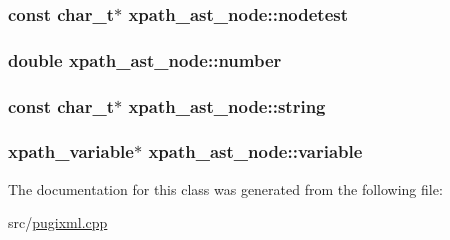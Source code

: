 \hypertarget{classxpath__ast__node_a50f44079b7f3e399e23488f520a34f17}{
\subsubsection[{nodetest}]{\setlength{\rightskip}{0pt plus 5cm}const char\_\-t$\ast$ {\bf xpath\_\-ast\_\-node::nodetest}}}
\label{classxpath__ast__node_a50f44079b7f3e399e23488f520a34f17}
\hypertarget{classxpath__ast__node_a73870c7a83538e525398855b26154484}{
\subsubsection[{number}]{\setlength{\rightskip}{0pt plus 5cm}double {\bf xpath\_\-ast\_\-node::number}}}
\label{classxpath__ast__node_a73870c7a83538e525398855b26154484}
\hypertarget{classxpath__ast__node_a187822d65799b3bbccd8d0522bd14e59}{
\subsubsection[{string}]{\setlength{\rightskip}{0pt plus 5cm}const char\_\-t$\ast$ {\bf xpath\_\-ast\_\-node::string}}}
\label{classxpath__ast__node_a187822d65799b3bbccd8d0522bd14e59}
\hypertarget{classxpath__ast__node_a0fd3b0d8f930836105eeff6e2efa5ad3}{
\subsubsection[{variable}]{\setlength{\rightskip}{0pt plus 5cm}xpath\_\-variable$\ast$ {\bf xpath\_\-ast\_\-node::variable}}}
\label{classxpath__ast__node_a0fd3b0d8f930836105eeff6e2efa5ad3}


The documentation for this class was generated from the following file:\begin{DoxyCompactItemize}
\item 
src/\hyperlink{pugixml_8cpp}{pugixml.cpp}\end{DoxyCompactItemize}
